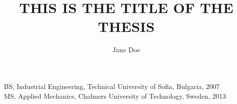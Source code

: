 \title
{
    {THIS IS THE TITLE OF THE THESIS}
}

\author{Jane Doe}

\prevdegrees
{
    BS, Industrial Engineering, Technical University of Sofia, Bulgaria, 2007
    \\
    MS, Applied Mechanics, Chalmers University of Technology, Sweden, 2013
}





\thesisdate{\today}

\frontmatter

\maketitle
